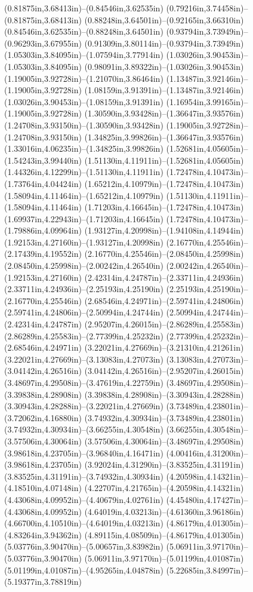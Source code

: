 (0.81875in,3.68413in)--(0.84546in,3.62535in) (0.79216in,3.74458in)--(0.81875in,3.68413in) (0.88248in,3.64501in)--(0.92165in,3.66310in) (0.84546in,3.62535in)--(0.88248in,3.64501in) (0.93794in,3.73949in)--(0.96293in,3.67955in) (0.91309in,3.80114in)--(0.93794in,3.73949in) (1.05303in,3.84095in)--(1.07594in,3.77914in) (1.03026in,3.90453in)--(1.05303in,3.84095in) (0.98091in,3.89322in)--(1.03026in,3.90453in) (1.19005in,3.92728in)--(1.21070in,3.86464in) (1.13487in,3.92146in)--(1.19005in,3.92728in) (1.08159in,3.91391in)--(1.13487in,3.92146in) (1.03026in,3.90453in)--(1.08159in,3.91391in) (1.16954in,3.99165in)--(1.19005in,3.92728in) (1.30590in,3.93428in)--(1.36647in,3.93576in) (1.24708in,3.93150in)--(1.30590in,3.93428in) (1.19005in,3.92728in)--(1.24708in,3.93150in) (1.34825in,3.99826in)--(1.36647in,3.93576in) (1.33016in,4.06235in)--(1.34825in,3.99826in) (1.52681in,4.05605in)--(1.54243in,3.99440in) (1.51130in,4.11911in)--(1.52681in,4.05605in) (1.44326in,4.12299in)--(1.51130in,4.11911in) (1.72478in,4.10473in)--(1.73764in,4.04424in) (1.65212in,4.10979in)--(1.72478in,4.10473in) (1.58094in,4.11464in)--(1.65212in,4.10979in) (1.51130in,4.11911in)--(1.58094in,4.11464in) (1.71203in,4.16645in)--(1.72478in,4.10473in) (1.69937in,4.22943in)--(1.71203in,4.16645in) (1.72478in,4.10473in)--(1.79886in,4.09964in) (1.93127in,4.20998in)--(1.94108in,4.14944in) (1.92153in,4.27160in)--(1.93127in,4.20998in) (2.16770in,4.25546in)--(2.17439in,4.19552in) (2.16770in,4.25546in)--(2.08450in,4.25998in) (2.08450in,4.25998in)--(2.00242in,4.26540in) (2.00242in,4.26540in)--(1.92153in,4.27160in) (2.42314in,4.24787in)--(2.33711in,4.24936in) (2.33711in,4.24936in)--(2.25193in,4.25190in) (2.25193in,4.25190in)--(2.16770in,4.25546in) (2.68546in,4.24971in)--(2.59741in,4.24806in) (2.59741in,4.24806in)--(2.50994in,4.24744in) (2.50994in,4.24744in)--(2.42314in,4.24787in) (2.95207in,4.26015in)--(2.86289in,4.25583in) (2.86289in,4.25583in)--(2.77399in,4.25232in) (2.77399in,4.25232in)--(2.68546in,4.24971in) (3.22021in,4.27669in)--(3.21310in,4.21261in) (3.22021in,4.27669in)--(3.13083in,4.27073in) (3.13083in,4.27073in)--(3.04142in,4.26516in) (3.04142in,4.26516in)--(2.95207in,4.26015in) (3.48697in,4.29508in)--(3.47619in,4.22759in) (3.48697in,4.29508in)--(3.39838in,4.28908in) (3.39838in,4.28908in)--(3.30943in,4.28288in) (3.30943in,4.28288in)--(3.22021in,4.27669in) (3.73489in,4.23801in)--(3.72062in,4.16880in) (3.74932in,4.30934in)--(3.73489in,4.23801in) (3.74932in,4.30934in)--(3.66255in,4.30548in) (3.66255in,4.30548in)--(3.57506in,4.30064in) (3.57506in,4.30064in)--(3.48697in,4.29508in) (3.98618in,4.23705in)--(3.96840in,4.16471in) (4.00416in,4.31200in)--(3.98618in,4.23705in) (3.92024in,4.31290in)--(3.83525in,4.31191in) (3.83525in,4.31191in)--(3.74932in,4.30934in) (4.20598in,4.14321in)--(4.18510in,4.07148in) (4.22707in,4.21765in)--(4.20598in,4.14321in) (4.43068in,4.09952in)--(4.40679in,4.02761in) (4.45480in,4.17427in)--(4.43068in,4.09952in) (4.64019in,4.03213in)--(4.61360in,3.96186in) (4.66700in,4.10510in)--(4.64019in,4.03213in) (4.86179in,4.01305in)--(4.83264in,3.94362in) (4.89115in,4.08509in)--(4.86179in,4.01305in) (5.03776in,3.90470in)--(5.00657in,3.83982in) (5.06911in,3.97170in)--(5.03776in,3.90470in) (5.06911in,3.97170in)--(5.01199in,4.01087in) (5.01199in,4.01087in)--(4.95265in,4.04878in) (5.22685in,3.84997in)--(5.19377in,3.78819in) 